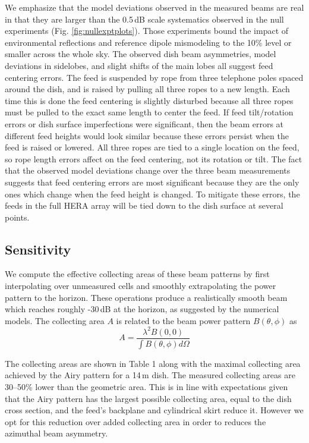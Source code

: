\documentclass{emulateapj}
\begin{document}
We emphasize that the model deviations observed in the measured beams are real in that they are larger than the 0.5\,dB scale systematics observed in the null experiments (Fig. \ref{fig:nullexptplots}). Those experiments bound the impact of environmental reflections and reference dipole mismodeling to the 10\% level or smaller across the whole sky. The observed dish beam asymmetries, model deviations in sidelobes, and slight shifts of the main lobes all suggest feed centering errors. The feed is suspended by rope from three telephone poles spaced around the dish, and is raised by pulling all three ropes to a new length. Each time this is done the feed centering is slightly disturbed because all three ropes must be pulled to the exact same length to center the feed. If feed tilt/rotation errors or dish surface imperfections were significant, then the beam errors at different feed heights would look similar because these errors persist when the feed is raised or lowered. All three ropes are tied to a single location on the feed, so rope length errors affect on the feed centering, not its rotation or tilt. The fact that the observed model deviations change over the three beam measurements suggests that feed centering errors are most significant because they are the only ones which change when the feed height is changed. To mitigate these errors, the feeds in the full HERA array will be tied down to the dish surface at several points.

\subsection{Sensitivity}

We compute the effective collecting areas of these beam patterns by first interpolating over unmeasured cells and smoothly extrapolating the power pattern to the horizon. These operations produce a realistically smooth beam which reaches roughly -30\,dB at the horizon, as suggested by the numerical models. The collecting area $A$ is related to the beam power pattern $B(\theta,\phi)$ as
\begin{equation}
	A=\frac{\lambda^2 B(0,0)}{\int B(\theta,\phi)d\Omega}
\end{equation}

The collecting areas are shown in Table 1 along with the maximal collecting area achieved by the Airy pattern for a 14\,m dish. The measured collecting areas are 30--50\% lower than the geometric area. This is in line with expectations given that the Airy pattern has the largest possible collecting area, equal to the dish cross section, and the feed's backplane and cylindrical skirt reduce it. However we opt for this reduction over added collecting area in order to reduces the azimuthal beam asymmetry.
\end{document}
